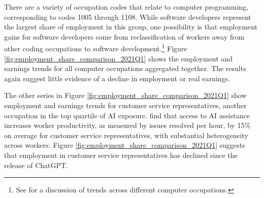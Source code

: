 \documentclass[12pt]{article}
\numberwithin{equation}{section}
\theoremstyle{theorem}\newcustomtheorem{theorem}{{\bf\sc Theorem}}
\theoremstyle{definition}\newcustomtheorem{assumption}{{\bf\sc Assumption}}
\theoremstyle{theorem} \newcustomtheorem{proposition}{{\bf\sc Proposition}}
\begin{document}
There are a variety of occupation codes that relate to computer programming, corresponding to codes 1005 through 1108. While software developers represent the largest share of employment in this group, one possibility is that employment gains for software developers come from reclassification of workers away from other coding occupations to software development.\footnote{See \citet{dam_more_2025} for a discussion of trends across different computer occupations.} Figure \ref{fig:employment_share_comparison_2021Q1} shows the employment and earnings trends for all computer occupations aggregated together. The results again suggest little evidence of a decline in employment or real earnings. 

The other series in Figure \ref{fig:employment_share_comparison_2021Q1} show employment and earnings trends for customer service representatives, another occupation in the top quartile of AI exposure. \citet{brynjolfsson_generative_2025} find that access to AI assistance increases worker productivity, as measured by issues resolved per hour, by 15\% on average for customer service representatives, with substantial heterogeneity across workers. Figure \ref{fig:employment_share_comparison_2021Q1} suggests that employment in customer service representatives has declined since the release of ChatGPT. 
\end{document}
